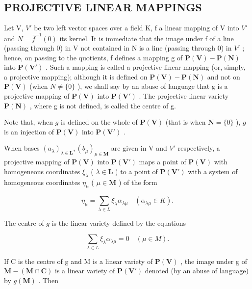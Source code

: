 \subsection{PROJECTIVE LINEAR MAPPINGS}

Let V, \(V'\) be two left vector spaces over a field K, f a linear mapping of V into \(V'\) and \(N = \bar{f}^{-1}(0)\) its kernel. It is immediate that the image under f of a line (passing through 0) in V not contained in N is a line (passing through 0) in \(V'\) ; hence, on passing to the quotients, f defines a mapping g of \(\mathbf{P}(\mathbf{V}) - \mathbf{P}(\mathbf{N})\) into \(\mathbf{P}(\mathbf{V}')\) . Such a mapping is called a projective linear mapping (or, simply, a projective mapping); although it is defined on \(\mathbf{P}(\mathbf{V}) - \mathbf{P}(\mathbf{N})\) and not on \(\mathbf{P}(\mathbf{V})\) (when \(N \neq \{0\}\) ), we shall say by an abuse of language that g is a projective mapping of \(\mathbf{P}(\mathbf{V})\) into \(\mathbf{P}(\mathbf{V}')\) . The projective linear variety \(\mathbf{P}(\mathbf{N})\) , where g is not defined, is called the centre of g.

Note that, when \(g\) is defined on the whole of \(\mathbf{P}(\mathbf{V})\) (that is when \(\mathbf{N} = \{0\}\) ), \(g\) is an injection of \(\mathbf{P}(\mathbf{V})\) into \(\mathbf{P}(\mathbf{V}')\) .

When bases \((a_{\lambda})_{\lambda\in\mathbf{L}}, (b_{\mu})_{\mu\in\mathbf{M}}\) are given in V and \(V'\) respectively, a projective mapping of \(\mathbf{P}(\mathbf{V})\) into \(\mathbf{P}(\mathbf{V}')\) maps a point of \(\mathbf{P}(\mathbf{V})\) with homogeneous coordinates \(\xi_{\lambda}\) ( \(\lambda \in \mathbf{L}\) ) to a point of \(\mathbf{P}(\mathbf{V}')\) with a system of homogeneous coordinates \(\eta_{\mu}\) ( \(\mu \in \mathbf{M}\) ) of the form

\[
\eta_ {\mu} = \sum_ {\lambda \in L} \xi_ {\lambda} \alpha_ {\lambda \mu} \quad (\alpha_ {\lambda \mu} \in K).\tag{6}
\]

The centre of \(g\) is the linear variety defined by the equations

\[
\sum_ {\lambda \in L} \xi_ {\lambda} \alpha_ {\lambda \mu} = 0 \quad (\mu \in M).
\]

If C is the centre of g and M is a linear variety of \(\mathbf{P}(\mathbf{V})\) , the image under g of \(\mathbf{M} - (\mathbf{M} \cap \mathbf{C})\) is a linear variety of \(\mathbf{P}(\mathbf{V}')\) denoted (by an abuse of language) by \(g(\mathbf{M})\) . Then

